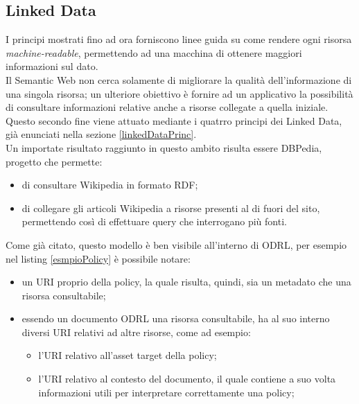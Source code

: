 \documentclass[12pt,a4paper,twoside]{book}
\begin{document}
\subsection{Linked Data}
I principi mostrati fino ad ora forniscono linee guida su come rendere ogni risorsa \textit{machine-readable}, permettendo ad una macchina di ottenere maggiori informazioni sul dato.\\
Il Semantic Web non cerca solamente di migliorare la qualità dell'informazione di una singola risorsa; un ulteriore obiettivo è fornire ad un applicativo la possibilità di consultare informazioni relative anche a risorse collegate a quella iniziale.\\
Questo secondo fine viene attuato mediante i quatrro principi dei Linked Data, già enunciati nella sezione \ref{linkedDataPrinc}.\\
Un importate risultato raggiunto in questo ambito risulta essere DBPedia\cite{dbpedia}, progetto che permette:
\begin{itemize}
	\item di consultare Wikipedia in formato RDF;
	\item di collegare gli articoli Wikipedia a risorse presenti al di fuori del sito, permettendo così di effettuare query che interrogano più fonti. 
\end{itemize}
Come già citato, questo modello è ben visibile all'interno di ODRL, per esempio nel listing \ref{esmpioPolicy} è possibile notare:
\begin{itemize}
	\item un URI proprio della policy, la quale risulta, quindi, sia un metadato che una risorsa consultabile;
	\item essendo un documento ODRL una risorsa consultabile, ha al suo interno diversi URI relativi ad altre risorse, come ad esempio:
	\begin{itemize}
		\item l'URI relativo all'asset target della policy;
		\item l'URI relativo al contesto del documento, il quale contiene a suo volta informazioni utili per interpretare correttamente una policy;
	\end{itemize}
\end{itemize}
\end{document}
